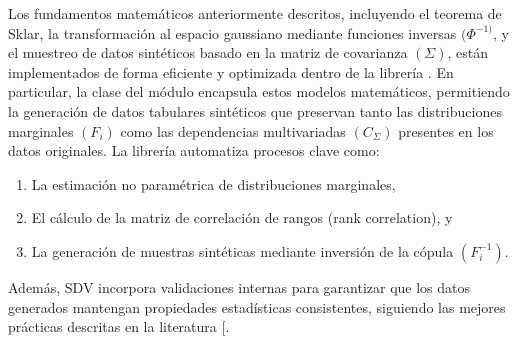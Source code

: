 \documentclass[a4paper,10pt,spanish]{jupyterBook}
\begin{document}
\sphinxAtStartPar
Los fundamentos matemáticos anteriormente descritos, incluyendo el teorema de Sklar, la transformación al espacio gaussiano mediante funciones inversas \((Φ^{-1)}\), y el muestreo de datos sintéticos basado en la matriz de covarianza \((Σ)\), están implementados de forma eficiente y optimizada dentro de la librería . En particular, la clase  del módulo  encapsula estos modelos matemáticos, permitiendo la generación de datos tabulares sintéticos que preservan tanto las distribuciones marginales \((F_i)\) como las dependencias multivariadas \((C_Σ)\) presentes en los datos originales. La librería automatiza procesos clave como:
\begin{enumerate}
%
\item {}
\sphinxAtStartPar
La estimación no paramétrica de distribuciones marginales,

\item {}
\sphinxAtStartPar
El cálculo de la matriz de correlación de rangos (rank correlation), y

\item {}
\sphinxAtStartPar
La generación de muestras sintéticas mediante inversión de la cópula \((F_{i}^{-1})\).

\end{enumerate}

\sphinxAtStartPar
Además, SDV incorpora validaciones internas para garantizar que los datos generados mantengan propiedades estadísticas consistentes, siguiendo las mejores prácticas descritas en la literatura {[}\sphinxhref{https://doi.org/10.1109/DSAA.2016.49}{Patki et al., 2016}{]}.
\end{document}
